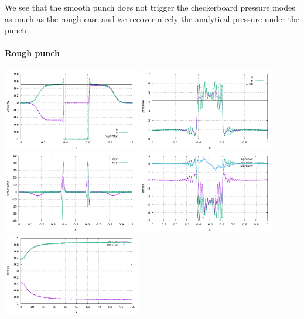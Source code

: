 We see that the smooth punch does not trigger the checkerboard pressure modes as much as the rough case 
and we recover nicely the analytical pressure under the punch \cite{thfb08,gltf18}.

\newpage
\paragraph{Rough punch} 

\begin{center}
\includegraphics[width=6cm]{python_codes/fieldstone_08/results/rough/velocity.pdf}
\includegraphics[width=6cm]{python_codes/fieldstone_08/results/rough/pressure.pdf}\\
\includegraphics[width=6cm]{python_codes/fieldstone_08/results/rough/strainrate.pdf}
\includegraphics[width=6cm]{python_codes/fieldstone_08/results/rough/stress.pdf}\\
\includegraphics[width=6cm]{python_codes/fieldstone_08/results/rough/u_stats.pdf}

\end{center}
